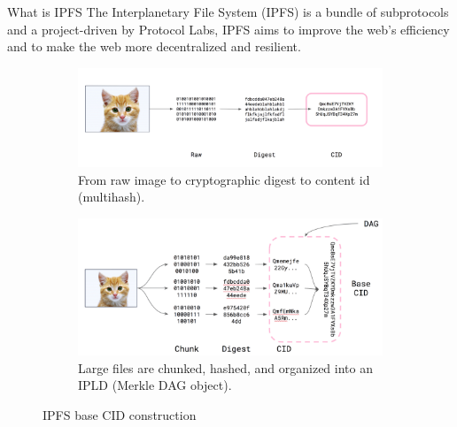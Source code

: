\documentclass[aspectratio=169,usenames,dvipsnames,pdftex]{beamer}
\begin{document}
  \begin{frame}{What is IPFS}
    The Interplanetary File System (IPFS) is a bundle of subprotocols and a project-driven by Protocol Labs, IPFS aims to improve the web’s efficiency and to make the web more decentralized and resilient. \\[-8pt]

    \begin{figure}
      \centering
      \begin{subfigure}[!hbtp]{0.45\textwidth}
        \centering
        \includegraphics[width=\textwidth]{ipfs_raw_dig_cid_1.png}
        \caption{From raw image to cryptographic digest to content id (multihash).}
        \label{img:ipfsalgorithmvis1}
      \end{subfigure}
      \begin{subfigure}[!hbtp]{0.45\textwidth}
        \centering
        \includegraphics[width=\textwidth]{ipfs_raw_dig_cid_2.png}
        \caption{Large files are chunked, hashed, and organized into an IPLD (Merkle DAG object).}
        \label{img:ipfsalgorithmvis2}
      \end{subfigure}
      \caption{IPFS base CID construction}
      \label{img:ipfsAlgorithmVis}
    \end{figure}
  \end{frame}
\end{document}
